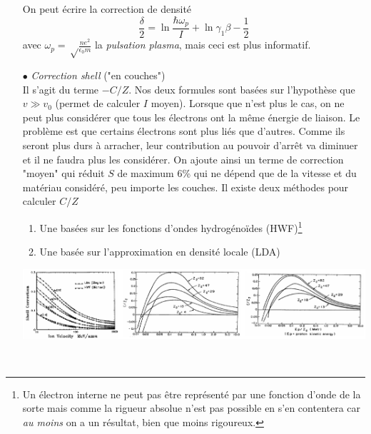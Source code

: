 \begin{itemize}
On peut écrire la correction de densité
\begin{equation}
\frac{\delta}{2}=\ln{\frac{\hbar\omega_p}{I}}+\ln{\gamma_1\beta}-\frac{1}{2}
\end{equation}
avec $\omega_p=\sqrt\frac{ne^2}{\epsilon_0m}$ la \textit{pulsation plasma}, mais ceci est plus
informatif.

\item[$\bullet$] \textit{Correction shell} ("en couches")\ \\
Il s'agit du terme $-C/Z$. Nos deux formules sont basées sur l'hypothèse que $v\gg v_0$ (permet
de calculer $I$ moyen). Lorsque que n'est plus le cas, on ne peut plus considérer que tous les
électrons ont la même énergie de liaison. Le problème est que certains électrons sont plus liés 
que d'autres. Comme ils seront plus durs à arracher, leur contribution au pouvoir d'arrêt va 
diminuer et il ne faudra plus les considérer. On ajoute ainsi un terme de correction "moyen" qui
réduit $S$ de maximum 6\% qui ne dépend que de la vitesse et du matériau considéré, peu importe 
les couches. Il existe deux méthodes pour calculer $C/Z$
	\begin{enumerate}
	\item Une basées sur les fonctions d'ondes hydrogénoïdes (HWF)\footnote{Un électron interne ne
	 peut
	 pas être représenté par une fonction d'onde de la sorte mais comme la rigueur absolue n'est 
	 pas possible en s'en contentera car \textit{au moins} on a un résultat, bien que moins 
	 rigoureux.}
	\item Une basée sur l'approximation en densité locale (LDA)
	\end{enumerate}
	
\hspace{-1cm}	\includegraphics[scale=0.4]{ch2/image4.png}
\end{itemize} \ \\

